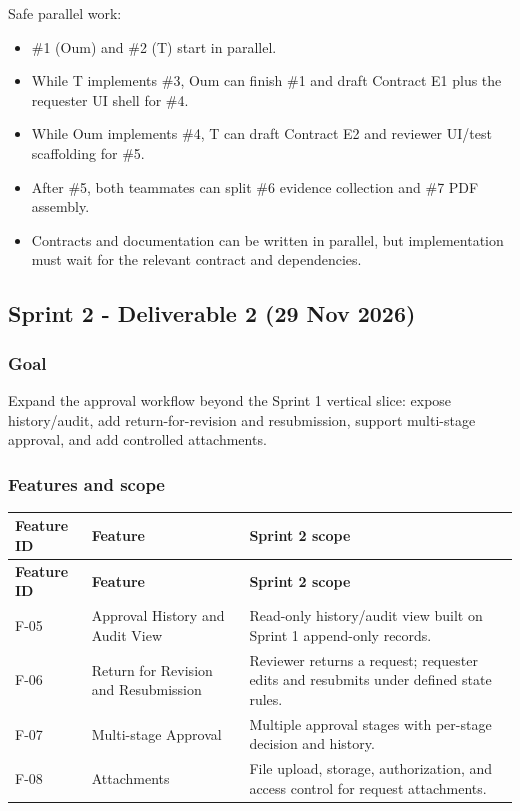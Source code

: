 \documentclass[11pt,a4paper]{article}
\begin{document}
Safe parallel work:\\

\begin{itemize}[leftmargin=*,itemsep=2pt,topsep=2pt]
  \item \#1 (Oum) and \#2 (T) start in parallel.
  \item While T implements \#3, Oum can finish \#1 and draft Contract E1 plus the requester UI shell for \#4.
  \item While Oum implements \#4, T can draft Contract E2 and reviewer UI/test scaffolding for \#5.
  \item After \#5, both teammates can split \#6 evidence collection and \#7 PDF assembly.
  \item Contracts and documentation can be written in parallel, but implementation must wait for the relevant contract and dependencies.
\end{itemize}

\subsection{Sprint 2 - Deliverable 2 (29 Nov 2026)}

\subsubsection{Goal}

Expand the approval workflow beyond the Sprint 1 vertical slice: expose history/audit, add return-for-revision and resubmission, support multi-stage approval, and add controlled attachments.\\

\subsubsection{Features and scope}

\vspace{0.3em}
\begin{longtable}{|>{\RaggedRight}p{3.0cm}|>{\RaggedRight}p{6.8cm}|>{\RaggedRight}p{5.2cm}|}
\hline
\rowcolor{zenPale}\textbf{Feature ID} & \textbf{Feature} & \textbf{Sprint 2 scope} \\ \hline
\endfirsthead
\hline
\rowcolor{zenPale}\textbf{Feature ID} & \textbf{Feature} & \textbf{Sprint 2 scope} \\ \hline
\endhead
\hline
\endfoot
F-05 & Approval History and Audit View & Read-only history/audit view built on Sprint 1 append-only records. \\ \hline
F-06 & Return for Revision and Resubmission & Reviewer returns a request; requester edits and resubmits under defined state rules. \\ \hline
F-07 & Multi-stage Approval & Multiple approval stages with per-stage decision and history. \\ \hline
F-08 & Attachments & File upload, storage, authorization, and access control for request attachments. \\ \hline
\end{longtable}
\vspace{0.3em}
\end{document}
